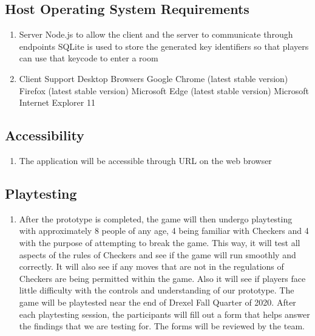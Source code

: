 \documentclass[10pt]{article}
\begin{document}
\subsection{Host Operating System Requirements}

\begin{enumerate}[label*=S\arabic*.]
    \item Server
        \subitem Node.js to allow the client and the server to communicate through endpoints
        \subitem SQLite is used to store the generated key identifiers so that players can use that keycode to enter a room
    \item Client
        \subitem Support Desktop Browsers
            \subsubitem Google Chrome (latest stable version)
            \subsubitem Firefox (latest stable version)
            \subsubitem Microsoft Edge (latest stable version)
            \subsubitem Microsoft Internet Explorer 11
\end{enumerate}

\subsection{Accessibility}

\begin{enumerate}[label*=N\arabic*.]
    \item The application will be accessible through URL on the web browser
\end{enumerate}

\subsection{Playtesting}

\begin{enumerate}[label*=N\arabic*.]
    \item After the prototype is completed, the game will then undergo playtesting with approximately 8 people of any age, 4 being familiar with Checkers and 4 with the purpose of attempting to break the game. This way, it will test all aspects of the rules of Checkers and see if the game will run smoothly and correctly. It will also see if any moves that are not in the regulations of Checkers are being permitted within the game. Also it will see if players face little difficulty with the controls and understanding of our prototype. The game will be playtested near the end of Drexel Fall Quarter of 2020. After each playtesting session, the participants will fill out a form that helps answer the findings that we are testing for. The forms will be reviewed by the team. 
\end{enumerate}
\pagebreak
\end{document}
